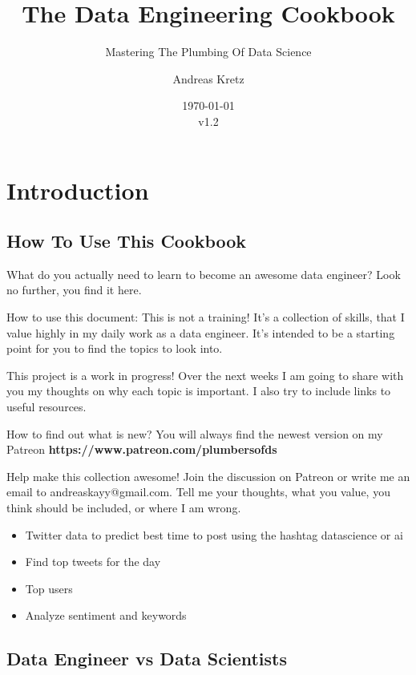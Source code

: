\documentclass[12pt, numbers=noenddot]{scrreprt} %
\title{The Data Engineering Cookbook}
\subtitle{Mastering The Plumbing Of Data Science}
\author{Andreas Kretz}
\date{\today\\v1.2}
\begin{document}
\maketitle


\pagebreak

\setcounter{tocdepth}{3}
\tableofcontents

\pagebreak

\part{Introduction}
\chapter{How To Use This Cookbook}
What do you actually need to learn to become an awesome data engineer?
Look no further, you find it here.

How to use this document: This is not a training! It's a collection of skills, that I value highly in my daily work as a data engineer. It's intended to be a starting point for you to find the topics to look into.

This project is a work in progress!
Over the next weeks I am going to share with you my thoughts on why each topic is important. I also try to include links to useful resources.

How to find out what is new?
You will always find the newest version on my Patreon \textbf{https://www.patreon.com/plumbersofds}

Help make this collection awesome!
Join the discussion on Patreon or write me an email to andreaskayy@gmail.com. Tell me your thoughts, what you value, you think should be included, or where I am wrong.

\begin{itemize}
\item Twitter data to predict best time to post using the hashtag datascience or ai
\item Find top tweets for the day
\item Top users
\item Analyze sentiment and keywords
\end{itemize}

\pagebreak

\chapter{Data Engineer vs Data Scientists}
\end{document}
